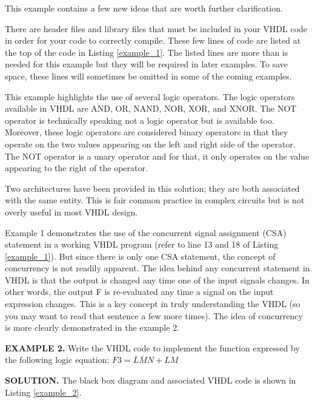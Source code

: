 This example contains a few new ideas that are worth further clarification.
\begin{my_list}
\item There are header files and library files that must be included in your VHDL code in order for your code to correctly compile. These few lines of code are listed at the top of the code in Listing \ref{example_1}. The listed lines are more than is needed for this example but they will be required in later examples. To save space, these lines will sometimes be omitted in some of the coming examples.
\item This example highlights the use of several logic operators. The logic operators available in VHDL are AND, OR, NAND, NOR, XOR, and XNOR. The NOT operator is technically speaking not a logic operator but is available too. Moreover, these logic operators are considered binary operators in that they operate on the two values appearing on the left and right side of the operator. The NOT operator is a unary operator and for that, it only operates on the value appearing to the right of the operator.
\item Two architectures have been provided in this solution; they are both associated with the same entity. This is fair common practice in complex circuits but is not overly useful in most VHDL design.
\end{my_list}
Example 1 demonstrates the use of the concurrent signal assignment (CSA) statement in a working VHDL program (refer to line 13 and 18 of Listing \ref{example_1}). But since there is only one CSA statement, the concept of concurrency is not readily apparent. The idea behind any concurrent statement in VHDL is that the output is changed any time one of the input signals changes. In other words, the output F is re-evaluated any time a signal on the input expression changes. This is a key concept in truly understanding the VHDL (so you may want to read that sentence a few more times). The idea of concurrency is more clearly demonstrated in the example 2.

\begin{leftbar}
\noindent
\textbf{EXAMPLE 2.}
Write the VHDL code to implement the function expressed by the following logic equation: $F3=\overline{L}\overline{M}N+LM$
\end{leftbar}
\noindent
\textbf{SOLUTION.} The black box diagram and associated VHDL code is shown in Listing \ref{example_2}.

